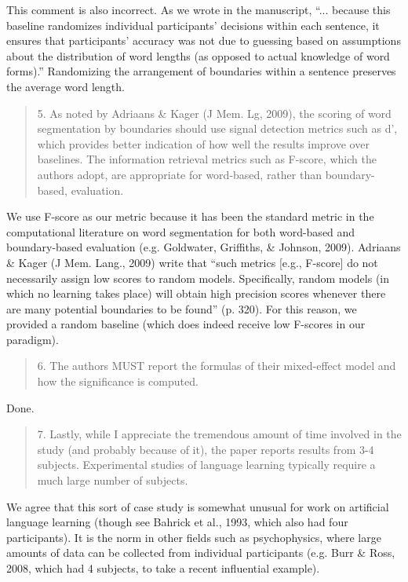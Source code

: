 \documentclass[12pt]{letter}
\begin{document}
This comment is also incorrect. As we wrote in the manuscript, ``... because this baseline randomizes individual participants' decisions within each sentence, it ensures that participants' accuracy was not due to guessing based on assumptions about the distribution of word lengths (as opposed to actual knowledge of word forms).'' Randomizing the arrangement of boundaries within a sentence preserves the average word length. 

\begin{quote}
5. As noted by Adriaans \& Kager (J Mem. Lg, 2009), the scoring of word segmentation by boundaries should use signal detection metrics such as d', which provides better indication of how well the results improve over baselines. The information retrieval metrics such as F-score, which the authors adopt, are appropriate for word-based, rather than boundary-based, evaluation. 
\end{quote}

We use F-score as our metric because it has been the standard metric in the computational literature on word segmentation for both word-based and boundary-based evaluation (e.g. Goldwater, Griffiths, \& Johnson, 2009). Adriaans \& Kager (J Mem. Lang., 2009) write that ``such metrics [e.g., F-score] do not necessarily assign low scores to random models. Specifically, random models (in which no learning takes place) will obtain high precision scores whenever there are many potential boundaries to be found'' (p. 320). For this reason, we provided a random baseline (which does indeed receive low F-scores in our paradigm). 

\begin{quote}
6. The authors MUST report the formulas of their mixed-effect model and how the significance is computed. 
\end{quote}

Done. 

\begin{quote}
7. Lastly, while I appreciate the tremendous amount of time involved in the study (and probably because of it), the paper reports results from 3-4 subjects. Experimental studies of language learning typically require a much large number of subjects.
\end{quote}

We agree that this sort of case study is somewhat unusual for work on artificial language learning (though see Bahrick et al., 1993, which also had four participants). It is the norm in other fields such as psychophysics, where large amounts of data can be collected from individual participants (e.g. Burr \& Ross, 2008, which had 4 subjects, to take a recent influential example). 
\end{document}
